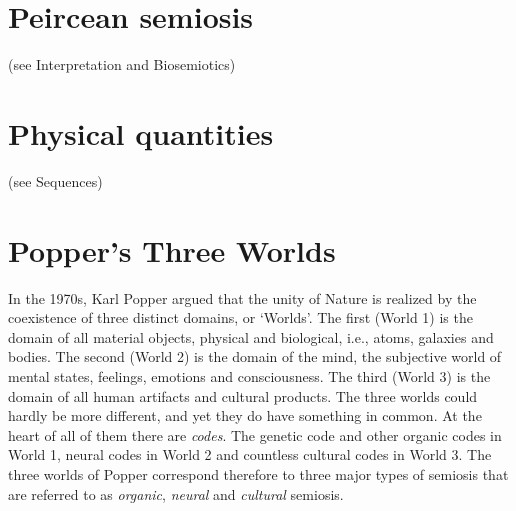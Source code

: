 \documentclass[12pt]{article}
\begin{document}
\section{Peircean semiosis} (see Interpretation and Biosemiotics)


\section{Physical quantities} (see Sequences)


\section{Popper's Three Worlds} 
In the 1970s, Karl Popper argued that the unity of Nature is realized by the coexistence of three distinct domains, or `Worlds'. The first (World 1) is the domain of all material objects, physical and biological, i.e., atoms, galaxies and bodies. The second (World 2) is the domain of the mind, the subjective world of mental states, feelings, emotions and consciousness. The third (World 3) is the domain of all human artifacts and cultural products. The three worlds could hardly be more different, and yet they do have something in common. At the heart of all of them there are \textit{codes}. The genetic code and other organic codes in World 1, neural codes in World 2 and countless cultural codes in World 3. The three worlds of Popper correspond therefore to three major types of semiosis that are referred to as \textit{organic}, \textit{neural} and \textit{cultural} semiosis. 
\end{document}
